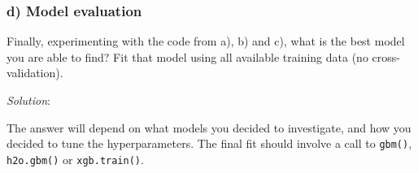 \documentclass[
]{article}
\newenvironment{Shaded}{\begin{snugshade}}{\end{snugshade}}
\newcommand{\CommentTok}[1]{\textcolor[rgb]{0.56,0.35,0.01}{\textit{#1}}}
\newcommand{\DecValTok}[1]{\textcolor[rgb]{0.00,0.00,0.81}{#1}}
\newcommand{\FunctionTok}[1]{\textcolor[rgb]{0.13,0.29,0.53}{\textbf{#1}}}
\newcommand{\NormalTok}[1]{#1}
\newcommand{\SpecialCharTok}[1]{\textcolor[rgb]{0.81,0.36,0.00}{\textbf{#1}}}
\begin{document}
\begin{Shaded}
\end{Shaded}

\hypertarget{d-model-evaluation}{%
\subsubsection{d) Model evaluation}\label{d-model-evaluation}}

Finally, experimenting with the code from a), b) and c), what is the
best model you are able to find? Fit that model using all available
training data (no cross-validation).

\emph{Solution}:

The answer will depend on what models you decided to investigate, and
how you decided to tune the hyperparameters. The final fit should
involve a call to \texttt{gbm()}, \texttt{h2o.gbm()} or
\texttt{xgb.train()}.
\end{document}
